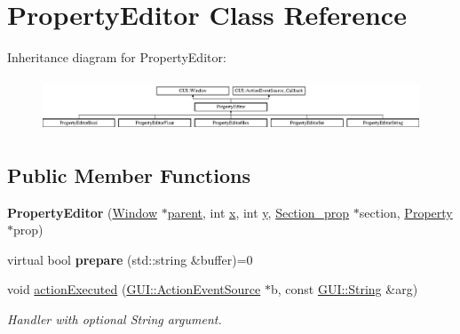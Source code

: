 \hypertarget{classPropertyEditor}{\section{Property\-Editor Class Reference}
\label{classPropertyEditor}
}
Inheritance diagram for Property\-Editor\-:\begin{figure}[H]
\begin{center}
\leavevmode
\includegraphics[height=1.592417cm]{classPropertyEditor}
\end{center}
\end{figure}
\subsection*{Public Member Functions}
\begin{DoxyCompactItemize}
\item 
\hypertarget{classPropertyEditor_a151b57c1268c0fe242efda58fba05423}{{\bfseries Property\-Editor} (\hyperlink{classGUI_1_1Window_ae828e9daa964dfc65a3550fb03117d30}{Window} $\ast$\hyperlink{classGUI_1_1Window_a2e593ff65e7702178d82fe9010a0b539}{parent}, int \hyperlink{classGUI_1_1Window_a6ca6a80ca00c9e1d8ceea8d3d99a657d}{x}, int \hyperlink{classGUI_1_1Window_a0ee8e923aff2c3661fc2e17656d37adf}{y}, \hyperlink{classSection__prop}{Section\-\_\-prop} $\ast$section, \hyperlink{classProperty}{Property} $\ast$prop)}\label{classPropertyEditor_a151b57c1268c0fe242efda58fba05423}

\item 
\hypertarget{classPropertyEditor_a5d97100d9b706468b73897870843a7ae}{virtual bool {\bfseries prepare} (std\-::string \&buffer)=0}\label{classPropertyEditor_a5d97100d9b706468b73897870843a7ae}

\item 
void \hyperlink{classPropertyEditor_a216c28dd01d93a55fbd7523c1924d4c7}{action\-Executed} (\hyperlink{classGUI_1_1ActionEventSource}{G\-U\-I\-::\-Action\-Event\-Source} $\ast$b, const \hyperlink{classGUI_1_1String}{G\-U\-I\-::\-String} \&arg)
\begin{DoxyCompactList}\small\item\em Handler with optional String argument. \end{DoxyCompactList}\end{DoxyCompactItemize}
